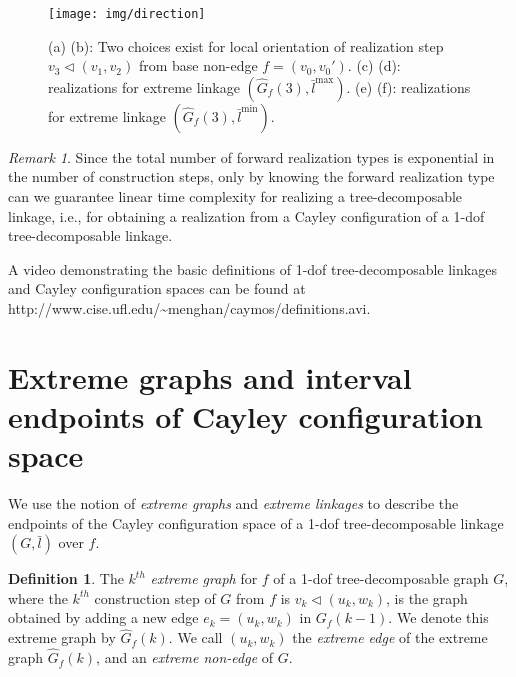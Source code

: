 \documentclass[secthm,amsthm,english]{article}
\theoremstyle{definition}
\newtheorem{definition}{Definition}
\theoremstyle{remark}
\newtheorem{remark}{Remark}
\begin{document}
\begin{figure}[h]
	  
	  
	
	\begin{centering}
	\texttt{[image: img/direction]}
	\par\end{centering}
	
	\caption{ (a) (b): Two choices exist for local orientation of
	realization step $v_{3}\triangleleft(v_{1},v_{2})$ from base non-edge $f=(v_{0},v_{0}')$. 
	(c) (d): realizations for extreme linkage $(\hat{G}_{f}(3),\bar{l}^{\max})$. 
	(e) (f): realizations for extreme linkage $(\hat{G}_{f}(3),\bar{l}^{\min})$.}
	
	
	\label{F:direction} 
\end{figure}


\begin{remark}
Since the total number of forward realization types is exponential in the number of construction steps,
only by knowing the forward realization type 
can we guarantee linear time complexity for realizing a tree-decomposable linkage, i.e., 
for obtaining a realization from a Cayley configuration of a 1-dof tree-decomposable linkage.
\end{remark}







\medskip
\noindent 
A video demonstrating the basic definitions of 
1-dof tree-decomposable linkages and Cayley configuration spaces 
can be found at http://www.cise.ufl.edu/\~{}menghan/caymos/definitions.avi.



\section{Extreme graphs and interval endpoints of Cayley configuration space}
\label{sec:Combinatorial-interpretation-of}

We use the notion of \emph{extreme graphs} and \emph{extreme linkages}
to describe the endpoints of the Cayley configuration space of a 
1-dof tree-decomposable linkage $(G, \bar{l})$ over $f$.


\begin{definition} \label{def:extreme-graph}
The $k^{th}$ {\emph{extreme graph}}
for $f$ of a 1-dof tree-decomposable graph $G$,
where the $k^{th}$ construction step of $G$ from $f$ is $v_{k}\triangleleft(u_k,w_k)$, 
is the  graph obtained by adding a new edge $e_{k}=(u_k,w_k)$ in $G_{f}(k-1)$. 
We denote this extreme graph by $\hat{G}_{f}(k)$.
We call $(u_k,w_k)$ the {\emph{extreme edge}} of the extreme graph $\hat{G}_{f}(k)$, 
and an {\emph{extreme non-edge}} of $G$.
\end{definition}
\end{document}
